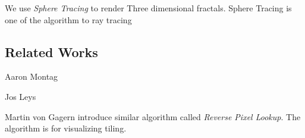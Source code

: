 We use \textit{Sphere Tracing} to render Three dimensional
fractals.
Sphere Tracing is one of the algorithm to ray tracing

\subsection{Related Works}

Aaron Montag

Jos Leys

Martin von Gagern introduce similar algorithm called \textit{Reverse
Pixel Lookup}. The algorithm is for visualizing tiling.